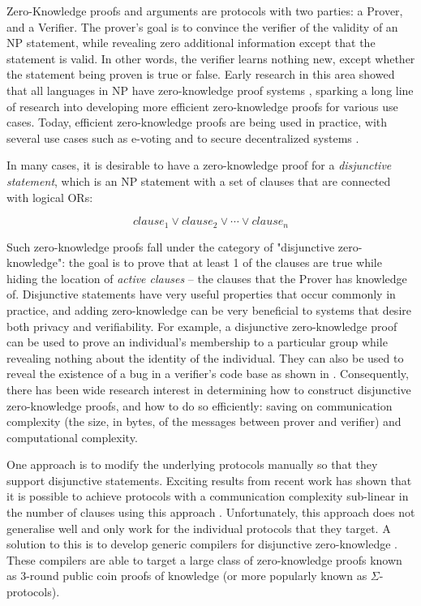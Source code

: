Zero-Knowledge proofs and arguments \cite{GMR85} are protocols with two parties: a Prover, and a Verifier. 
The prover's goal is to convince the verifier of the validity of an NP statement, while revealing zero additional 
information except that the statement is valid. In other words, the verifier learns nothing new, except whether 
the statement being proven is true or false. Early research in this area showed that all languages in NP have 
zero-knowledge proof systems \cite{DBLP:conf/focs/GoldreichMW86}, sparking a long line of research into developing 
more efficient zero-knowledge proofs for various use cases. Today, efficient zero-knowledge proofs are being used 
in practice, with several use cases such as e-voting and to secure decentralized systems \cite{zcash, evoting}.

In many cases, it is desirable to have a zero-knowledge proof for a \textit{disjunctive statement}, which is an NP 
statement with a set of clauses that are connected with logical ORs:

$$
clause_1 \lor clause_2 \lor \cdots \lor clause_n
$$

Such zero-knowledge proofs fall under the category of "disjunctive zero-knowledge": the goal is to prove that at least 1 of the clauses are true 
while hiding the location of \textit{active clauses} -- the clauses that the Prover has knowledge of. 
Disjunctive statements have very useful properties that occur commonly in practice, and adding zero-knowledge can be very beneficial to  
systems that desire both privacy and verifiability. For example, a disjunctive zero-knowledge proof can be used to prove an 
individual's membership to a particular group while revealing nothing about the identity of the individual. They can also be 
used to reveal the existence of a bug in a verifier's code base as shown in \cite{StackedGF}. Consequently, there has been 
wide research interest in determining how to construct disjunctive zero-knowledge proofs, and how to do so efficiently: saving 
on communication complexity (the size, in bytes, of the messages between prover and verifier) and computational complexity.  

One approach is to modify the underlying protocols manually so that they support disjunctive statements. Exciting results from recent 
work has shown that it is possible to achieve protocols with a communication complexity sub-linear in the number of clauses using 
this approach \cite{StackedGF,attema}. Unfortunately, this approach does not generalise well and only work for the individual protocols 
that they target. A solution to this is to develop generic compilers for disjunctive zero-knowledge \cite{CDS94,StackingSigmas}. These 
compilers are able to target a large class of zero-knowledge proofs known as 3-round public coin proofs of knowledge (or more popularly 
known as $\Sigma$-protocols).


